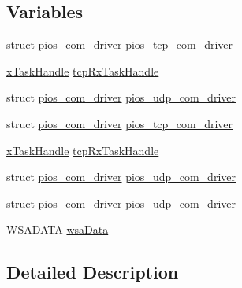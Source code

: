 \subsection*{Variables}
\begin{DoxyCompactItemize}
\item 
struct \hyperlink{structpios__com__driver}{pios\-\_\-com\-\_\-driver} \hyperlink{group___p_i_o_s___u_d_p_gae22d8a8963cc7f41d351eca5d6ec835a}{pios\-\_\-tcp\-\_\-com\-\_\-driver}
\item 
\hyperlink{_common_2_libraries_2_free_r_t_o_s_2_source_2include_2task_8h_a271ae40d5db07d928a113766505a0965}{x\-Task\-Handle} \hyperlink{group___p_i_o_s___u_d_p_ga0ba5f55b2aa18edf726675729e68624e}{tcp\-Rx\-Task\-Handle}
\item 
struct \hyperlink{structpios__com__driver}{pios\-\_\-com\-\_\-driver} \hyperlink{group___p_i_o_s___u_d_p_ga58da5534fd5007351a8ed77275aa8ad2}{pios\-\_\-udp\-\_\-com\-\_\-driver}
\item 
struct \hyperlink{structpios__com__driver}{pios\-\_\-com\-\_\-driver} \hyperlink{group___p_i_o_s___u_d_p_gae22d8a8963cc7f41d351eca5d6ec835a}{pios\-\_\-tcp\-\_\-com\-\_\-driver}
\item 
\hyperlink{_common_2_libraries_2_free_r_t_o_s_2_source_2include_2task_8h_a271ae40d5db07d928a113766505a0965}{x\-Task\-Handle} \hyperlink{group___p_i_o_s___u_d_p_ga0ba5f55b2aa18edf726675729e68624e}{tcp\-Rx\-Task\-Handle}
\item 
struct \hyperlink{structpios__com__driver}{pios\-\_\-com\-\_\-driver} \hyperlink{group___p_i_o_s___u_d_p_ga58da5534fd5007351a8ed77275aa8ad2}{pios\-\_\-udp\-\_\-com\-\_\-driver}
\item 
struct \hyperlink{structpios__com__driver}{pios\-\_\-com\-\_\-driver} \hyperlink{group___p_i_o_s___u_d_p_ga58da5534fd5007351a8ed77275aa8ad2}{pios\-\_\-udp\-\_\-com\-\_\-driver}
\item 
W\-S\-A\-D\-A\-T\-A \hyperlink{group___p_i_o_s___u_d_p_ga99d916e8fd71179b86cd135c2a27a905}{wsa\-Data}
\end{DoxyCompactItemize}


\subsection{Detailed Description}


